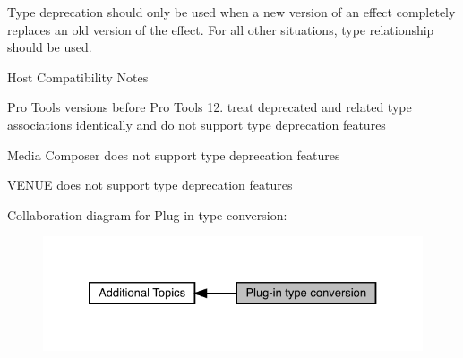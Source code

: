 Type deprecation should only be used when a new version of an effect completely replaces an old version of the effect. For all other situations, type relationship should be used.

\begin{DoxyRefDesc}{Host Compatibility Notes}
\item[\mbox{\hyperlink{a00786__compatibility_notes000010}{Host Compatibility Notes}}]\end{DoxyRefDesc}
\begin{DoxyItemize}
\item Pro Tools versions before Pro Tools 12. treat deprecated and related type associations identically and do not support type deprecation features \item Media Composer does not support type deprecation features \item V\+E\+N\+UE does not support type deprecation features \end{DoxyItemize}
Collaboration diagram for Plug-\/in type conversion\+:
\nopagebreak
\begin{figure}[H]
\begin{center}
\leavevmode
\includegraphics[width=327pt]{a00826}
\end{center}
\end{figure}
